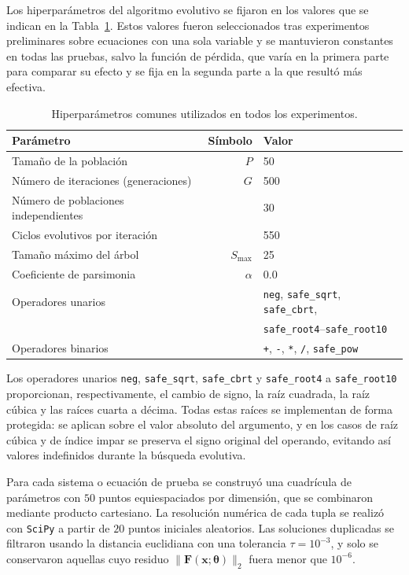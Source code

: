 \documentclass{article} \usepackage[utf8]{inputenc} \usepackage[spanish]{babel} \usepackage{amsmath, amssymb, amsthm} \usepackage{bm} \usepackage{float} \usepackage{longtable} \usepackage[hidelinks]{hyperref} \spanishdecimal{.}
\newcommand{\xvec}{\mathbf{x}} \newcommand{\thetavec}{\boldsymbol{\theta}} \newcommand{\Fvec}{\mathbf{F}} \newcommand{\R}{\mathbb{R}} \newcommand{\norm}[1]{\left\lVert#1\right\rVert} \newcommand{\loss}{\mathcal{L}} \newcommand{\dataset}{\mathcal{D}} \newcommand{\jac}{\mathbf{J}}
\begin{document}
Los hiperparámetros del algoritmo evolutivo se fijaron en los valores que se indican en la Tabla~\ref{tab:hiperparams}. Estos valores fueron seleccionados tras experimentos preliminares sobre ecuaciones con una sola variable y se mantuvieron constantes en todas las pruebas, salvo la función de pérdida, que varía en la primera parte para comparar su efecto y se fija en la segunda parte a la que resultó más efectiva.

\begin{table}[H] \centering \caption{Hiperparámetros comunes utilizados en todos los experimentos.} \label{tab:hiperparams} \begin{tabular}{lrl} \hline
Parámetro & Símbolo & Valor \\
\hline
Tamaño de la población & $P$ & 50 \\
Número de iteraciones (generaciones) & $G$ & 500 \\
Número de poblaciones independientes & & 30 \\
Ciclos evolutivos por iteración & & 550 \\
Tamaño máximo del árbol & $S_{\max}$ & 25 \\
Coeficiente de parsimonia & $\alpha$ & 0.0 \\
Operadores unarios & & \texttt{neg}, \texttt{safe\_sqrt}, \texttt{safe\_cbrt}, \\
 & & \texttt{safe\_root4}--\texttt{safe\_root10} \\
Operadores binarios & & \texttt{+}, \texttt{-}, \texttt{*}, \texttt{/}, \texttt{safe\_pow} \\
\hline \end{tabular} \end{table}

Los operadores unarios \texttt{neg}, \texttt{safe\_sqrt}, \texttt{safe\_cbrt} y \texttt{safe\_root4} a \texttt{safe\_root10} proporcionan, respectivamente, el cambio de signo, la raíz cuadrada, la raíz cúbica y las raíces cuarta a décima. Todas estas raíces se implementan de forma protegida: se aplican sobre el valor absoluto del argumento, y en los casos de raíz cúbica y de índice impar se preserva el signo original del operando, evitando así valores indefinidos durante la búsqueda evolutiva.

Para cada sistema o ecuación de prueba se construyó una cuadrícula de parámetros con $50$ puntos equiespaciados por dimensión, que se combinaron mediante producto cartesiano. La resolución numérica de cada tupla se realizó con \texttt{SciPy} \cite{virtanen2020scipy} a partir de $20$ puntos iniciales aleatorios. Las soluciones duplicadas se filtraron usando la distancia euclidiana con una tolerancia $\tau = 10^{-3}$, y solo se conservaron aquellas cuyo residuo $\|\Fvec(\xvec; \thetavec)\|_2$ fuera menor que $10^{-6}$.
\end{document}
